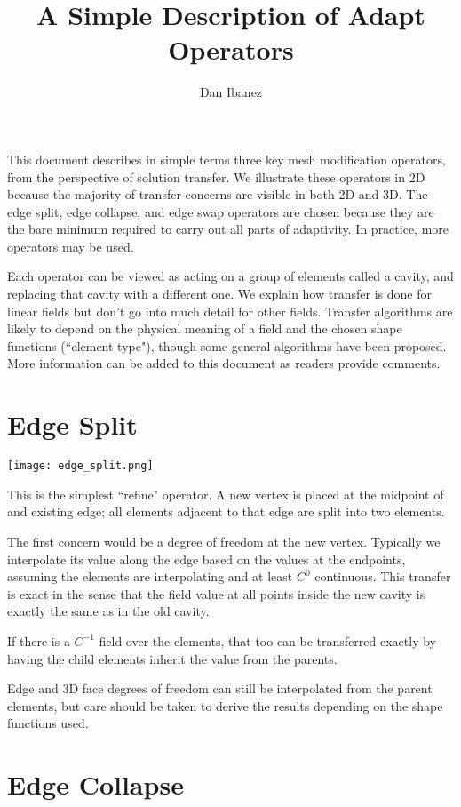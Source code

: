 \documentclass{article}
\title{A Simple Description of Adapt Operators}
\author{Dan Ibanez}
\begin{document}
\maketitle

This document describes in simple terms three key
mesh modification operators, from the perspective
of solution transfer.
We illustrate these operators in 2D because
the majority of transfer concerns are visible in
both 2D and 3D.
The edge split, edge collapse, and edge swap
operators are chosen because they are the bare minimum
required to carry out all parts of adaptivity.
In practice, more operators may be used.

Each operator can be viewed as acting on a group
of elements called a cavity, and replacing that
cavity with a different one.
We explain how transfer is done for linear fields
but don't go into much detail for other fields.
Transfer algorithms are likely to depend on the
physical meaning of a field and the
chosen shape functions (``element type"),
though some general algorithms have been proposed.
More information can be added to this document as
readers provide comments.

\section{Edge Split}

{\center\texttt{[image: edge\_split.png]}}

This is the simplest ``refine" operator.
A new vertex is placed at the midpoint of
and existing edge; all elements adjacent to
that edge are split into two elements.

The first concern would be a degree of freedom
at the new vertex.
Typically we interpolate its value along the
edge based on the values at the endpoints,
assuming the elements are interpolating and
at least $C^{0}$ continuous.
This transfer is exact in the sense that the
field value at all points inside the new cavity is exactly the
same as in the old cavity.

If there is a $C^{-1}$ field over the elements,
that too can be transferred exactly by
having the child elements inherit the value
from the parents.

Edge and 3D face degrees of freedom can still
be interpolated from the parent elements,
but care should be taken to derive the results
depending on the shape functions used.

\section{Edge Collapse}
\end{document}
